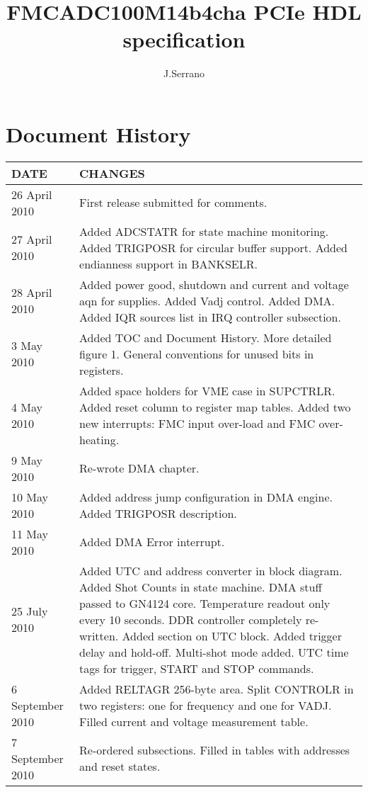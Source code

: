 \documentclass[a4paper]{article}
\title{FMCADC100M14b4cha PCIe HDL specification}
\author{J.Serrano}
\begin{document}
\maketitle
\newpage

\section*{Document History}
\begin{table}[htbp]
  \centering
  \begin{tabularx}{\textwidth}{|l|X|}
    \hline
    \textbf{DATE} & \textbf{CHANGES} \\
    \hline
    \hline
    26 April 2010 & First release submitted for comments.\\
    \hline
    27 April 2010 & Added ADCSTATR for state machine monitoring. Added TRIGPOSR for circular buffer support. Added endianness support in BANKSELR.\\
    \hline
    28 April 2010 & Added power good, shutdown and current and voltage aqn for supplies. Added Vadj control. Added DMA. Added IQR sources list in IRQ controller subsection.\\
    \hline
    3 May 2010 & Added TOC and Document History. More detailed figure 1. General conventions for unused bits in registers. \\ 
    \hline
    4 May 2010 & Added space holders for VME case in SUPCTRLR. Added reset column to register map tables. Added two new interrupts: FMC input over-load and FMC over-heating.\\
    \hline
    9 May 2010 & Re-wrote DMA chapter.\\
    \hline
    10 May 2010 & Added address jump configuration in DMA engine. Added TRIGPOSR description.\\
    \hline
    11 May 2010 & Added DMA Error interrupt.\\
    \hline
    25 July 2010 & Added UTC and address converter in block diagram. Added Shot Counts in state machine. DMA stuff passed to GN4124 core. Temperature readout only every 10 seconds. DDR controller completely re-written. Added section on UTC block. Added trigger delay and hold-off. Multi-shot mode added. UTC time tags for trigger, START and STOP commands.\\
    \hline
    6 September 2010 & Added RELTAGR 256-byte area. Split CONTROLR in two registers: one for frequency and one for VADJ. Filled current and voltage measurement table.\\
    \hline
    7 September 2010 & Re-ordered subsections. Filled in tables with addresses and reset states.\\

\end{tabularx}
\end{table}
\end{document}
